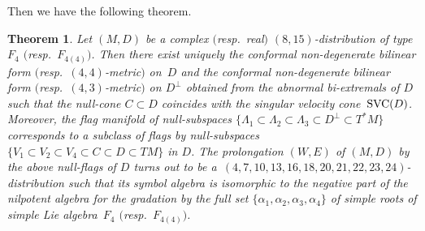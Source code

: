 \documentclass[pdftex]{sigma}
\numberwithin{equation}{section}
\newtheorem{Theorem}{Theorem}[section]
\theoremstyle{definition}
\newcommand{\0}{\boldsymbol{0}}
\newcommand{\SVC}{{\mbox {\rm SVC}}}
\begin{document}
Then we have the following theorem.

\begin{Theorem}\label{Main-Theorem}
 Let $(M, D)$ be a complex $($resp.\ real$)$ $(8, 15)$-distribution of type $F_4$ $($resp.\ $F_{4(4)})$.
Then there exist uniquely the conformal non-degenerate bilinear form $($resp.\ $(4, 4)$-metric$)$ on~$D$ and the conformal non-degenerate bilinear form $($resp.\ $(4, 3)$-metric$)$ on $D^\perp$ obtained from the abnormal bi-extremals of $D$
such that the null-cone $C \subset D$ coincides with the singular velocity cone~$\SVC(D)$.
Moreover, the flag manifold of null-subspaces
${\bigl\{ \Lambda_1 \subset \Lambda_2 \subset \Lambda_3 \subset D^\perp \subset T^*M\bigr\}}$
corresponds to a subclass of flags by null-subspaces ${\{ V_1 \subset V_2 \subset V_4 \subset C \subset D \subset TM\}}$ in $D$. The prolongation $(W, E)$ of $(M, D)$ by the above null-flags of $D$
turns out to be a~$(4,7,10,13,16,18,20,\allowbreak 21,22,23,24)$-distribution such that its symbol algebra
is isomorphic to the negative part of the nilpotent algebra for the gradation by the full set
$\{\alpha_1, \alpha_2, \alpha_3, \alpha_4\}$ of simple roots
of simple Lie algebra~$F_4$ $($resp.\ $F_{4(4)})$.
\end{Theorem}
\end{document}
